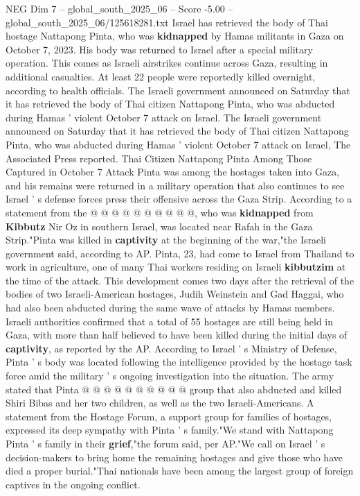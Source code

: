 \begin{textsample}{NEG Dim 7 – global\_south\_2025\_06 – Score -5.00 – global\_south\_2025\_06/125618281.txt}  \label{ex:f7_neg_276}
Israel has retrieved the body of Thai hostage Nattapong Pinta, who was \textbf{kidnapped} by Hamas militants in Gaza on October 7, 2023.
His body was returned to Israel after a special military operation.
This comes as Israeli airstrikes continue across Gaza, resulting in additional casualties.
At least 22 people were reportedly killed overnight, according to health officials.
The Israeli government announced on Saturday that it has retrieved the body of Thai citizen Nattapong Pinta, who was abducted during Hamas ' violent October 7 attack on Israel.
The Israeli government announced on Saturday that it has retrieved the body of Thai citizen Nattapong Pinta, who was abducted during Hamas ' violent October 7 attack on Israel, The Associated Press reported.
Thai Citizen Nattapong Pinta Among Those Captured in October 7 Attack Pinta was among the hostages taken into Gaza, and his remains were returned in a military operation that also continues to see Israel ' s defense forces press their offensive across the Gaza Strip.
According to a statement from the @ @ @ @ @ @ @ @ @ @, who was \textbf{kidnapped} from \textbf{Kibbutz} Nir Oz in southern Israel, was located near Rafah in the Gaza Strip."Pinta was killed in \textbf{captivity} at the beginning of the war,"the Israeli government said, according to AP.
Pinta, 23, had come to Israel from Thailand to work in agriculture, one of many Thai workers residing on Israeli \textbf{kibbutzim} at the time of the attack.
This development comes two days after the retrieval of the bodies of two Israeli-American hostages, Judih Weinstein and Gad Haggai, who had also been abducted during the same wave of attacks by Hamas members.
Israeli authorities confirmed that a total of 55 hostages are still being held in Gaza, with more than half believed to have been killed during the initial days of \textbf{captivity}, as reported by the AP.
According to Israel ' s Ministry of Defense, Pinta ' s body was located following the intelligence provided by the hostage task force amid the military ' s ongoing investigation into the situation.
The army stated that Pinta @ @ @ @ @ @ @ @ @ @ group that also abducted and killed Shiri Bibas and her two children, as well as the two Israeli-Americans.
A statement from the Hostage Forum, a support group for families of hostages, expressed its deep sympathy with Pinta ' s family."We stand with Nattapong Pinta ' s family in their \textbf{grief},"the forum said, per AP."We call on Israel ' s decision-makers to bring home the remaining hostages and give those who have died a proper burial."Thai nationals have been among the largest group of foreign captives in the ongoing conflict.

\end{textsample}
